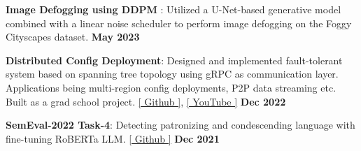 \begin{zitemize}
\item \textbf{Image Defogging using DDPM} : Utilized a U-Net-based generative model combined with a linear noise scheduler to perform image defogging on the Foggy Cityscapes dataset.  \hfill \textbf{May 2023}
\item \textbf{Distributed Config Deployment}: Designed and implemented fault-tolerant system based on spanning tree topology using gRPC as communication layer. Applications being multi-region config deployments, P2P data streaming etc. Built as a grad school project. \href{https://github.com/tushar-rishav/CSCI5273_Final_Project}{[ Github ]}, \href{https://www.youtube.com/watch?v=tZjVTBsGzvQ}{[ YouTube ]}  \hfill \textbf{Dec 2022}
\item \textbf{SemEval-2022 Task-4}: Detecting patronizing and condescending language with fine-tuning RoBERTa LLM. \href{https://github.com/tushar-rishav/SemEval-2022}{[ Github ]} \hfill \textbf{Dec 2021}
\vspace{1mm}
\end{zitemize}



